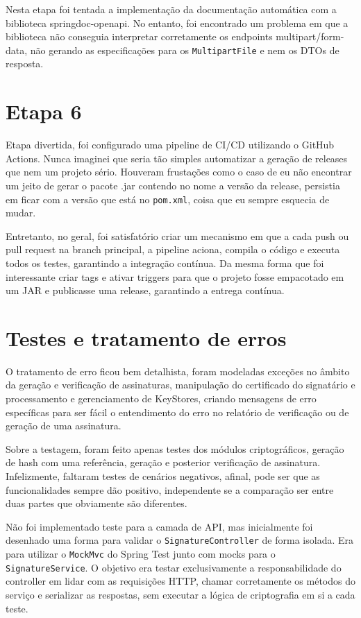 \documentclass{article}
\begin{document}
    Nesta etapa foi tentada a implementação da documentação automática com a biblioteca springdoc-openapi. No entanto, foi encontrado um problema em que a biblioteca não conseguia interpretar corretamente os endpoints multipart/form-data, não gerando as especificações para os \texttt{MultipartFile} e nem os DTOs de resposta.

    \section{Etapa 6}

    Etapa divertida, foi configurado uma pipeline de CI/CD utilizando o GitHub Actions. Nunca imaginei que seria tão simples automatizar a geração de releases que nem um projeto sério. Houveram frustações como o caso de eu não encontrar um jeito de gerar o pacote .jar contendo no nome a versão da release, persistia em ficar com a versão que está no \texttt{pom.xml}, coisa que eu sempre esquecia de mudar.

    Entretanto, no geral, foi satisfatório criar um mecanismo em que a cada push ou pull request na branch principal, a pipeline aciona, compila o código e executa todos os testes, garantindo a integração contínua. Da mesma forma que foi interessante criar tags e ativar triggers para que o projeto fosse empacotado em um JAR e publicasse uma release, garantindo a entrega contínua.

    \section{Testes e tratamento de erros}

    O tratamento de erro ficou bem detalhista, foram modeladas exceções no âmbito da geração e verificação de assinaturas, manipulação do certificado do signatário e processamento e gerenciamento de KeyStores, criando mensagens de erro específicas para ser fácil o entendimento do erro no relatório de verificação ou de geração de uma assinatura.

    Sobre a testagem, foram feito apenas testes dos módulos criptográficos, geração de hash com uma referência, geração e posterior verificação de assinatura. Infelizmente, faltaram testes de cenários negativos, afinal, pode ser que as funcionalidades sempre dão positivo, independente se a comparação ser entre duas partes que obviamente são diferentes.

    Não foi implementado teste para a camada de API, mas inicialmente foi desenhado uma forma para validar o \texttt{SignatureController} de forma isolada. Era para utilizar o \texttt{MockMvc} do Spring Test junto com mocks para o \texttt{SignatureService}. O objetivo era testar exclusivamente a responsabilidade do controller em lidar com as requisições HTTP, chamar corretamente os métodos do serviço e serializar as respostas, sem executar a lógica de criptografia em si a cada teste.
\end{document}
